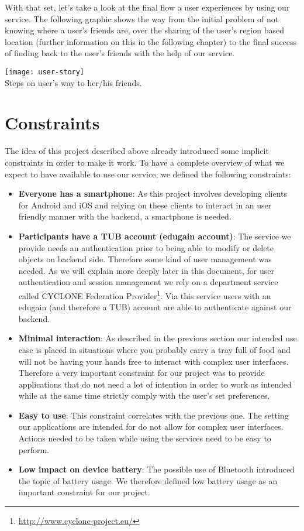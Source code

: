 With that set, let's take a look at the final flow a user experiences by using our service. The following graphic shows the way from the initial problem of not knowing where a user's friends are, over the sharing of the user's region based location (further information on this in the following chapter) to the final success of finding back to the user's friends with the help of our service.

\begin{center}
    \texttt{[image: user-story]}\\
    Steps on user's way to her/his friends.
\end{center}


\section{Constraints}

The idea of this project described above already introduced some implicit constraints in order to make it work. To have a complete overview of what we expect to have available to use our service, we defined the following constraints:

\begin{itemize}
    \item \textbf{Everyone has a smartphone}: As this project involves developing clients for Android and iOS and relying on these clients to interact in an user friendly manner with the backend, a smartphone is needed.
    \item \textbf{Participants have a TUB account (edugain account)}: The service we provide needs an authentication prior to being able to modify or delete objects on backend side. Therefore some kind of user management was needed. As we will explain more deeply later in this document, for user authentication and session management we rely on a department service called CYCLONE Federation Provider\footnote{\url{http://www.cyclone-project.eu/}}. Via this service users with an edugain (and therefore a TUB) account are able to authenticate against our backend.
    \item \textbf{Minimal interaction}: As described in the previous section our intended use case is placed in situations where you probably carry a tray full of food and will not be having your hands free to interact with complex user interfaces. Therefore a very important constraint for our project was to provide applications that do not need a lot of intention in order to work as intended while at the same time strictly comply with the user's set preferences.
    \item \textbf{Easy to use}: This constraint correlates with the previous one. The setting our applications are intended for do not allow for complex user interfaces. Actions needed to be taken while using the services need to be easy to perform.
    \item \textbf{Low impact on device battery}: The possible use of Bluetooth introduced the topic of battery usage. We therefore defined low battery usage as an important constraint for our project.
\end{itemize}


